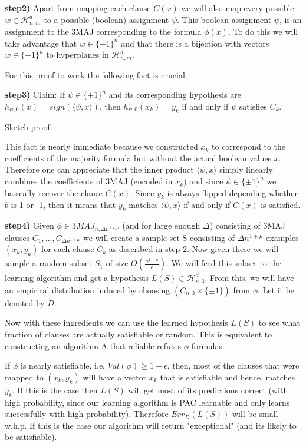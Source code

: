 \documentclass[11pt,a4paper]{article}
\begin{document}
\textbf{step2)} Apart from mapping each clause $C(x)$ we will also map every possible $w \in\mathcal{H}^d_{n,m}$ to a possible (boolean) assignment $\psi $. This boolean assignment $\psi$, is an assignment to the 3MAJ corresponding to the formula $\phi(x)$. To do this we will take advantage that $w \in \{ \pm 1 \}^n $ and that there is a bijection with vectors $w \in \{ \pm 1 \}^n $ to hyperplanes in $\mathcal{H}^d_{n,m}$.

For this proof to work the following fact is crucial:

\textbf{step3) } Claim: If $\psi \in \{ \pm 1 \}^n $ and its corresponding hypothesis are $h_{\psi, 0} (x) = sign ( \langle \psi , x \rangle )$, then $h_{\psi, 0} (x_k) = y_k$ if and only if $\psi$ satisfies $C_k$.

Sketch proof:

This fact is nearly immediate because we constructed $x_k$ to correspond to the coefficients of the majority formula but without the actual boolean values $x$. Therefore one can appreciate that the inner product  $ \langle \psi , x \rangle $ simply linearly combines the coefficients of 3MAJ (encoded in $x_k$) and since $\psi \in \{ \pm 1\}^n$ we basically recover the clause $C(x)$. Since $y_k$ is always flipped depending whether $b$ is 1 or -1, then it means that $y_k$ matches $\langle \psi , x \rangle $ if and only if $C(x)$ is satisfied.

\textbf{step4) } Given $\phi \in 3MAJ_{n, \Delta n^{1 + \mu}}$ (and for large enough $\Delta$) consisting of 3MAJ clauses $C_1, ..., C_{\Delta n^{1 + \mu}}$ we will create a sample set S consisting of $\Delta n^{1 + \mu}$ examples $(x_k, y_k)$ for each clause $C_k$ as described in step 2. Now given these we will sample a random subset $S_1$ of size $O(\frac{n^{1+\mu}}{\epsilon} )$. We will feed this subset to the learning algorithm and get a hypothesis $L(S) \in \mathcal{H}^d_{n,3}$. From this, we will have an empirical distribution induced by choosing $(C_{n,3} \times \{ \pm 1\})$ from $\phi$. Let it be denoted by $D$.

Now with these ingredients we can use the learned hypothesis $L(S)$ to see what fraction of clauses are actually satisfiable or random. This is equivalent to constructing an algorithm A that reliable refutes $\phi$ formulas.

If $\phi$ is nearly satisfiable, i.e. $Val(\phi) \geq 1 - \epsilon$, then, most of the clauses that were mapped to $(x_k, y_k)$ will have a vector $x_k$ that is satisfiable and hence, matches $y_k$. If this is the case then $L(S)$ will get most of its predictions correct (with high probability, since our learning algorithm is PAC learnable and only learns successfully with high probability). Therefore $ Err_{D}(L(S)) $ will be small w.h.p. If this is the case our algorithm will return "exceptional" (and its likely to be satisfiable).
\end{document}
